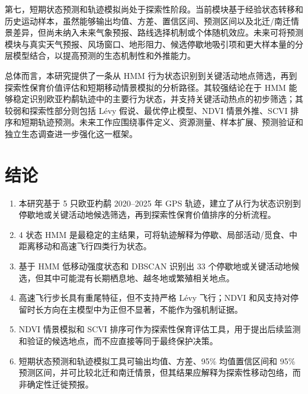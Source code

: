 \documentclass[UTF8,a4paper,12pt]{ctexart}
\begin{document}
第七，短期状态预测和轨迹模拟尚处于探索性阶段。当前模块基于经验状态转移和历史运动样本，虽然能够输出均值、方差、置信区间、预测区间以及北迁/南迁情景差异，但尚未纳入未来气象预报、路线选择机制或个体随机效应。未来可将预测模块与真实天气预报、风场窗口、地形阻力、候选停歇地吸引项和更大样本量的分层模型结合，以提高预测的生态机制性和外推能力。

总体而言，本研究提供了一条从 HMM 行为状态识别到关键活动地点筛选，再到探索性保育价值评估和短期移动情景模拟的分析路径。其较强结论在于 HMM 能够稳定识别欧亚杓鹬轨迹中的主要行为状态，并支持关键活动热点的初步筛选；其较弱和探索性部分则包括 L\'evy 假说、最优停止模型、NDVI 情景外推、SCVI 排序和短期轨迹预测。未来工作应围绕事件定义、资源测量、样本扩展、预测验证和独立生态调查进一步强化这一框架。

\section{结论}

\begin{enumerate}
  \item 本研究基于 5 只欧亚杓鹬 2020--2025 年 GPS 轨迹，建立了从行为状态识别到停歇地或关键活动地候选筛选，再到探索性保育价值排序的分析流程。
  \item 4 状态 HMM 是最稳定的主结果，可将轨迹解释为停歇、局部活动/觅食、中距离移动和高速飞行四类行为状态。
  \item 基于 HMM 低移动强度状态和 DBSCAN 识别出 33 个停歇地或关键活动地候选，但其中可能混有长期栖息地、越冬地或繁殖相关地点。
  \item 高速飞行步长具有重尾特征，但不支持严格 L\'evy 飞行；NDVI 和风支持对停留时长方向在主模型中为正但不显著，不能作为强机制证据。
  \item NDVI 情景模拟和 SCVI 排序可作为探索性保育评估工具，用于提出后续监测和验证的候选地点，而不应直接等同于最终保护决策。
  \item 短期状态预测和轨迹模拟工具可输出均值、方差、95\% 均值置信区间和 95\% 预测区间，并可比较北迁和南迁情景，但其结果应解释为探索性移动包络，而非确定性迁徙预报。
\end{enumerate}
\end{document}
